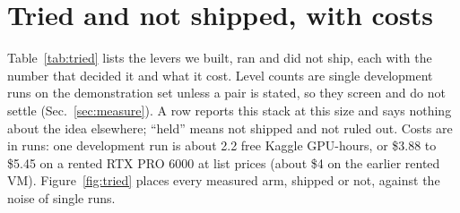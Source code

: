 \section{Tried and not shipped, with costs}\label{app:tried}

Table~\ref{tab:tried} lists the levers we built, ran and did not ship, each with the number that decided it and what it cost.
Level counts are single development runs on the demonstration set unless a pair is stated, so they screen and do not settle (Sec.~\ref{sec:measure}). %
A row reports this stack at this size and says nothing about the idea elsewhere; ``held'' means not shipped and not ruled out.
Costs are in runs: one development run is about 2.2 free Kaggle GPU-hours, or \$3.88 to \$5.45 on a rented RTX PRO 6000 at list prices (about \$4 on the earlier rented VM). %
Figure~\ref{fig:tried} places every measured arm, shipped or not, against the noise of single runs.

